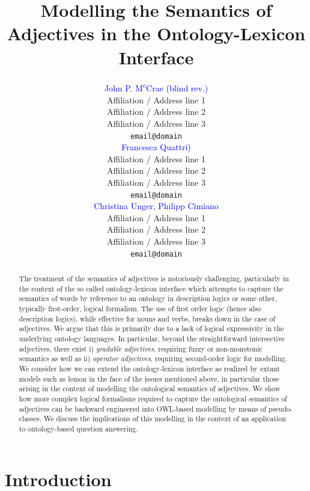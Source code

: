 \documentclass[11pt]{article}
\title{Modelling the Semantics of Adjectives in the Ontology-Lexicon Interface}
\author{\textcolor{blue}{John P. M\textsuperscript{c}Crae (blind rev.)}\\
  Affiliation / Address line 1 \\
  Affiliation / Address line 2 \\
  Affiliation / Address line 3 \\
  {\tt email@domain} \\\And
  \textcolor{blue}{Francesca Quattri)} \\
  Affiliation / Address line 1 \\
  Affiliation / Address line 2 \\
  Affiliation / Address line 3 \\
  {\tt email@domain} \\\And
  \textcolor{blue}{Christina Unger, Philipp Cimiano} \\
  Affiliation / Address line 1 \\
  Affiliation / Address line 2 \\
  Affiliation / Address line 3 \\
{\tt email@domain}}
\date{}
\begin{document}
\maketitle
\begin{abstract}
The treatment of the semantics of adjectives is notoriously challenging, particularly in the context of the so called ontology-lexicon interface which attempts to capture the semantics of words by reference to an ontology in description logics or some other, typically first-order, logical formalism.
The use of first order logic (hence also description logics),
while effective for nouns and verbs, breaks down in the case of adjectives. 
We argue that this is primarily due to a lack of logical expressivity in the 
underlying ontology languages. In particular, beyond the straightforward intersective adjectives, there exist i) \emph{gradable adjectives}, requiring fuzzy or
non-monotonic semantics as well as ii) \emph{operator adjectives}, requiring second-order logic for modelling. 
We consider how we can extend the ontology-lexicon interface as realized by extant models such as lemon in the face of the issues mentioned above, in particular those arising in the context of modelling the ontological semantics of adjectives. We show how more complex logical formalisms required to capture the ontological semantics of adjectives can be backward 
engineered into OWL-based modelling by means of pseudo-classes. We discuss the implications of this modelling in the context of an application to ontology-based question answering.
\end{abstract}



\section{Introduction}
\label{intro}
\end{document}
